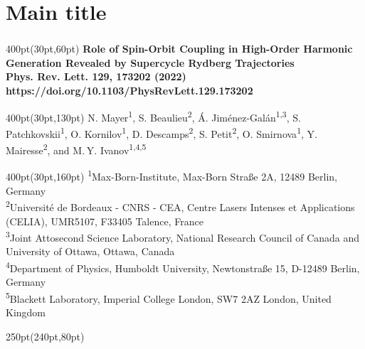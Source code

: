 \section{Main title}


\begin{frame}
\frametitle{}
	\framesubtitle{ }
\small
\begin{textblock*}{400pt}(30pt,60pt)
\bfseries\Large\centering
Role of Spin-Orbit Coupling in High-Order Harmonic Generation
Revealed by Supercycle Rydberg Trajectories \\\vspace{5pt}
\small Phys. Rev. Lett. 129, 173202 (2022) \\
\Tiny https://doi.org/10.1103/PhysRevLett.129.173202
\end{textblock*}

\begin{textblock*}{400pt}(30pt,130pt)
\centering
N. Mayer\textsuperscript{1}, 
S. Beaulieu\textsuperscript{2},
\'A. Jim\'enez-Gal\'an\textsuperscript{1,3}, 
S. Patchkovskii\textsuperscript{1}, 
O. Kornilov\textsuperscript{1}, 
D. Descamps\textsuperscript{2},
S. Petit\textsuperscript{2},
O. Smirnova\textsuperscript{1},
Y. Mairesse\textsuperscript{2},
and M. Y. Ivanov\textsuperscript{1,4,5}
\end{textblock*}

\begin{textblock*}{400pt}(30pt,160pt)
\centering\scriptsize
\textsuperscript{1}Max-Born-Institute, Max-Born Straße 2A,
 12489 Berlin, Germany\\ 
\textsuperscript{2}Universit\'e de Bordeaux - CNRS - CEA, 
Centre Lasers Intenses et Applications (CELIA), 
UMR5107, F33405 Talence, France \\
\textsuperscript{3}Joint Attosecond Science Laboratory, 
National Research Council of Canada and University of Ottawa, Ottawa, Canada \\
\textsuperscript{4}Department of Physics, Humboldt University, Newtonstraße 15,
D-12489 Berlin, Germany \\
\textsuperscript{5}Blackett Laboratory, Imperial College London, 
SW7 2AZ London, United Kingdom
\end{textblock*}

\begin{textblock*}{250pt}(240pt,80pt)
\end{textblock*}

\end{frame}

